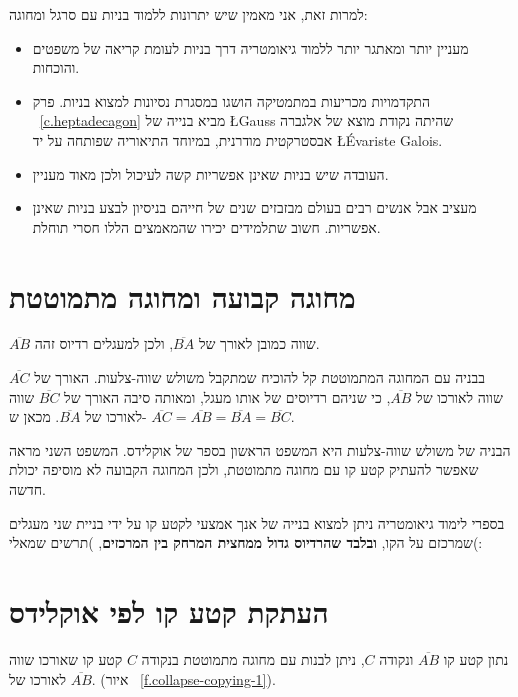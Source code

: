 למרות זאת, אני מאמין שיש יתרונות ללמוד בניות עם סרגל ומחוגה:
\begin{itemize}
\item
מעניין יותר ומאתגר יותר ללמוד גיאומטריה דרך בניות לעומת קריאה של משפטים והוכחות.
\item
התקדמויות מכריעות במתמטיקה הושגו במסגרת נסיונות למצוא בניות. פרק%
~\ref{c.heptadecagon}
מביא בנייה של 
\L{Gauss}
שהיתה נקודת מוצא של אלגברה אבסטרקטית מודרנית, במיוחד התיאוריה שפותחה על יד 
\L{\'{E}variste Galois}.
\item
העובדה שיש בניות שאינן אפשריות קשה לעיכול ולכן מאוד מעניין.
\item
מעציב אבל אנשים רבים בעולם מבזבזים שנים של חייהם בניסיון לבצע בניות שאינן אפשריות. חשוב שתלמידים יכירו שהמאמצים הללו חסרי תוחלת.
\end{itemize}



\section{מחוגה קבועה ומחוגה מתמוטטת}\label{s.collapse}

$\overline{AB}$
שווה כמובן לאורך של
$\overline{BA}$,
ולכן למעגלים רדיוס זהה.

בבניה עם המחוגה המתמוטטת קל להוכיח שמתקבל משולש שווה-צלעות. האורך של
$\overline{AC}$
שווה לאורכו של
$\overline{AB}$,
כי שניהם רדיוסים של אותו מעגל, ומאותה סיבה האורך של
$\overline{BC}$
שווה לאורכו של
$\overline{BA}$.
מכאן ש-%
$\overline{AC} = \overline{AB} = \overline{BA} = \overline{BC}$.

הבניה של משולש שווה-צלעות היא המשפט הראשון בספר של אוקלידס. המשפט השני מראה שאפשר להעתיק קטע קו עם מחוגה מתמוטטת, ולכן המחוגה הקבועה לא מוסיפה יכולת חדשה. 

בספרי לימוד גיאומטריה ניתן למצוא בנייה של אנך אמצעי לקטע קו על ידי בניית שני מעגלים שמרכזם על הקו, 
\textbf{ובלבד שהרדיוס גדול ממחצית המרחק בין המרכזים},
)תרשים שמאלי(:



\section{העתקת קטע קו לפי אוקלידס}\label{s.collapse-copy}

\begin{theorem}
נתון קטע קו
$\overline{AB}$
ונקודה
$C$,
ניתן לבנות עם מחוגה מתמוטטת בנקודה
$C$
קטע קו שאורכו שווה לאורכו של 
$\overline{AB}$.
(איור%
~\ref{f.collapse-copying-1}).
\end{theorem}

